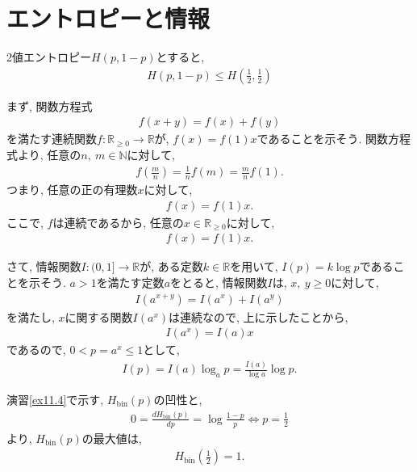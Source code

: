 \chapter{エントロピーと情報}

\begin{ex}
    \label{ex11.1}
    2値エントロピー$H(p,1-p)$とすると,
    \begin{align*}
        H\left(p,1-p\right) \leq H\left(\frac{1}{2}, \frac{1}{2}\right)
    \end{align*}
\end{ex}

\begin{ex}
    \label{ex11.2}
    まず, 関数方程式
    \begin{align*}
        f(x+y) = f(x) + f(y)
    \end{align*}
    を満たす連続関数$f \colon \mathbb{R}_{\ge 0} \to \mathbb{R}$が, $f(x) = f(1)x$であることを示そう. 関数方程式より, 任意の$n, \ m \in \mathbb{N}$に対して,
    \begin{align*}
        f\left( \frac{m}{n}\right) =  \frac{1}{n} f(m) = \frac{m}{n} f(1).
    \end{align*}
    つまり, 任意の正の有理数$x$に対して,
    \begin{align*}
        f(x) = f(1)x.
    \end{align*}
    ここで, $f$は連続であるから, 任意の$x \in \mathbb{R}_{\ge 0}$に対して,
    \begin{align*}
        f(x) = f(1) x.
    \end{align*}
    \par
    さて, 情報関数$I : (0,1] \to \mathbb{R}$が, ある定数$k \in \mathbb{R}$を用いて, $I(p) = k \log p$であることを示そう.
    $a >1$を満たす定数$a$をとると, 情報関数$I$は, $x, \  y \ge 0$に対して,
    \begin{align*}
        I ( a^{x+y}) = I(a^x) + I(a^y)
    \end{align*}
    を満たし, $x$に関する関数$I(a^x)$は連続なので, 上に示したことから,
    \begin{align*}
        I(a^x) = I(a) x
    \end{align*}
    であるので, $0 < p = a^x \leq 1$として,
    \begin{align*}
        I(p) = I(a) \log_a p = \frac{I(a)}{\log a} \log p.
    \end{align*}
\end{ex}

\begin{ex}
    \label{ex11.3}
    演習\ref{ex11.4}で示す, $H_{\text{bin}}(p)$の凹性と,
    \begin{align*}
        0 = \frac{d H_{\text{bin}}(p)}{dp} = \log \frac{1-p}{p}
        \iff p = \frac{1}{2}
    \end{align*}
    より, $H_{\text{bin}}(p)$の最大値は,
    \begin{align*}
        H_{\text{bin}} \left( \frac{1}{2}\right) = 1.
    \end{align*}
\end{ex}

